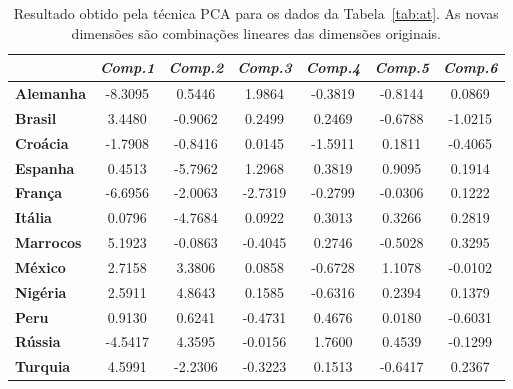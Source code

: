 \begin{table}[!h]
    \footnotesize
    \caption[Resultado de PCA]
    {Resultado obtido pela técnica PCA para os dados da
    Tabela~\ref{tab:at}. As novas dimensões são combinações lineares das dimensões
originais.}
    \begin{center}
        \begin{tabular}{|l|c|c|c|c|c|c|}
            \hline
            & \multicolumn{1}{l|}{\textbf{\textit{Comp.1}}}
            & \multicolumn{1}{l|}{\textbf{\textit{Comp.2}}}
            & \multicolumn{1}{l|}{\textbf{\textit{Comp.3}}}
            & \multicolumn{1}{l|}{\textbf{\textit{Comp.4}}}
            & \multicolumn{1}{l|}{\textbf{\textit{Comp.5}}}
            & \multicolumn{1}{l|}{\textbf{\textit{Comp.6}}}
            \\ \hline
    \textbf{Alemanha} & -8.3095 & 0.5446 & 1.9864 & -0.3819 & -0.8144 & 0.0869 \\ \hline
    \textbf{Brasil} & 3.4480 & -0.9062 & 0.2499 & 0.2469 & -0.6788 & -1.0215 \\ \hline
    \textbf{Croácia} & -1.7908 & -0.8416 & 0.0145 & -1.5911 & 0.1811 & -0.4065 \\ \hline
    \textbf{Espanha} & 0.4513 & -5.7962 & 1.2968 & 0.3819 & 0.9095 & 0.1914 \\ \hline
    \textbf{França} & -6.6956 & -2.0063 & -2.7319 & -0.2799 & -0.0306 & 0.1222 \\ \hline
    \textbf{Itália} & 0.0796 & -4.7684 & 0.0922 & 0.3013 & 0.3266 & 0.2819 \\ \hline
    \textbf{Marrocos} & 5.1923 & -0.0863 & -0.4045 & 0.2746 & -0.5028 & 0.3295 \\ \hline
    \textbf{México} & 2.7158 & 3.3806 & 0.0858 & -0.6728 & 1.1078 & -0.0102 \\ \hline
    \textbf{Nigéria} & 2.5911 & 4.8643 & 0.1585 & -0.6316 & 0.2394 & 0.1379 \\ \hline
    \textbf{Peru} & 0.9130 & 0.6241 & -0.4731 & 0.4676 &
            0.0180 & -0.6031 \\ \hline
    \textbf{Rússia} & -4.5417 & 4.3595 & -0.0156 & 1.7600 & 0.4539 & -0.1299 \\ \hline
    \textbf{Turquia} & 4.5991 & -2.2306 & -0.3223 & 0.1513 & -0.6417 & 0.2367 \\ \hline
        \end{tabular}
    \end{center}
    \label{tab:at-pcs}
\end{table}

